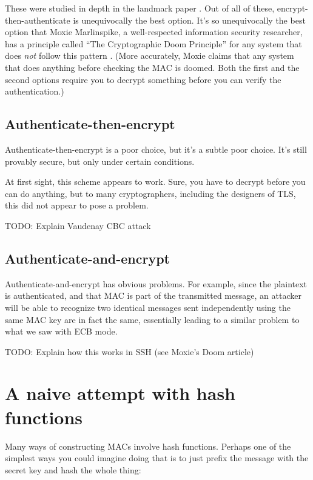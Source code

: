 \documentclass[11pt,ebook,table,dvipsnames]{memoir}
\begin{document}
These were studied in depth in the landmark paper
\cite{krawczyk:order}. Out of all of these, encrypt-then-authenticate
is unequivocally the best option. It's so unequivocally the best
option that Moxie Marlinspike, a well-respected information security
researcher, has a principle called \enquote{The Cryptographic Doom Principle}
for any system that does \emph{not} follow this pattern \cite{moxie:doom}.
(More accurately, Moxie claims that any system that does anything
before checking the MAC is doomed. Both the first and the second
options require you to decrypt something before you can verify the
authentication.)

\subsection{Authenticate-then-encrypt}
\label{sec-2-7-2-1}

Authenticate-then-encrypt is a poor choice, but it's a subtle poor
choice. It's still provably secure\cite{krawczyk:order}, but only
under certain conditions.

At first sight, this scheme appears to work. Sure, you have to
decrypt before you can do anything, but to many cryptographers,
including the designers of TLS, this did not appear to pose a
problem.

TODO: Explain Vaudenay CBC attack \cite{vaudenay:cbcpadding}
\subsection{Authenticate-and-encrypt}
\label{sec-2-7-2-2}

Authenticate-and-encrypt has obvious problems. For example, since the
plaintext is authenticated, and that MAC is part of the transmitted
message, an attacker will be able to recognize two identical messages
sent independently using the same MAC key are in fact the same,
essentially leading to a similar problem to what we saw with
\gls{ECB mode}.

TODO: Explain how this works in SSH (see Moxie's Doom article)

\section{A naive attempt with hash functions}
\label{sec-2-7-3}

Many ways of constructing MACs involve hash functions. Perhaps one of
the simplest ways you could imagine doing that is to just prefix the
message with the secret key and hash the whole thing:
\end{document}
